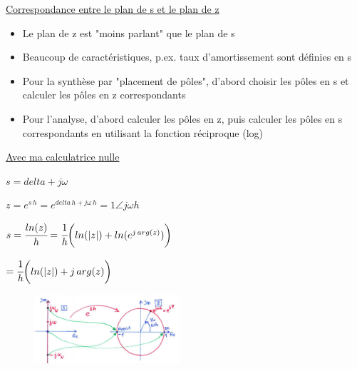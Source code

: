 \underline{Correspondance entre le plan de s et le plan de z}

\begin{itemize}
    \item Le plan de z est "moins parlant" que le plan de s
    \item Beaucoup de caractéristiques, p.ex. taux d'amortissement sont définies en s
    \item Pour la synthèse par "placement de pôles", d'abord choisir les pôles en s et calculer les pôles en z correspondants
    \item Pour l'analyse, d'abord calculer les pôles en z, puis calculer les pôles en s correspondants en utilisant la fonction réciproque (log)
\end{itemize}

\underline{Avec ma calculatrice nulle}

$s = delta + j\omega$

$z = e^{s\,h} = e^{delta\,h + j\omega\,h} = 1\angle j\omega h $

$s = \cfrac{ln(z)}{h} = \cfrac{1}{h} \bigg(ln(|z|)+ln(e^{j\,arg(z)})\bigg) $

$=\cfrac{1}{h} \bigg(ln(|z|)+j\,arg(z)\bigg)$

\begin{figure}[H]
    \includegraphics[width  = 0.48\textwidth]{img/ZtoS.JPG}
\end{figure}


